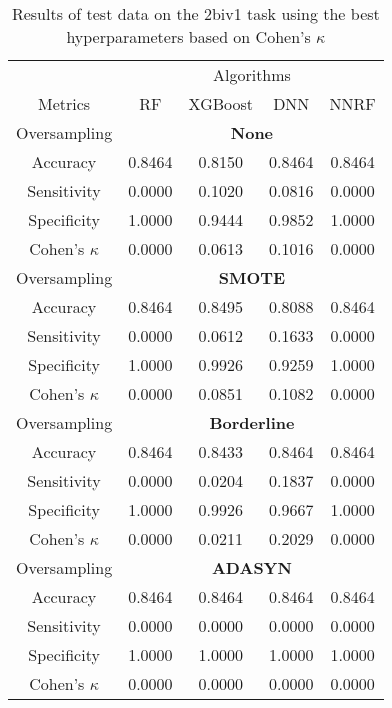 \begin{table}[!htb]
\centering
\caption{Results of test data on the 2biv1 task using the best hyperparameters based on Cohen's $\kappa$}
\label{tab:2biv1_test_results}
\begin{tabular}{c | c c c c}
\hline
 & \multicolumn{4}{c}{Algorithms}\\ 
Metrics &RF & XGBoost & DNN & NNRF\\ 
\hline
Oversampling &\multicolumn{4}{|c}{\textbf{None}}\\ 
\hline
Accuracy & 0.8464 & 0.8150 & 0.8464 & 0.8464\\ 
Sensitivity & 0.0000 & 0.1020 & 0.0816 & 0.0000\\ 
Specificity & 1.0000 & 0.9444 & 0.9852 & 1.0000\\ 
Cohen's $\kappa$ & 0.0000 & 0.0613 & 0.1016 & 0.0000\\ 
\hline
Oversampling &\multicolumn{4}{|c}{\textbf{SMOTE}}\\ 
\hline
Accuracy & 0.8464 & 0.8495 & 0.8088 & 0.8464\\ 
Sensitivity & 0.0000 & 0.0612 & 0.1633 & 0.0000\\ 
Specificity & 1.0000 & 0.9926 & 0.9259 & 1.0000\\ 
Cohen's $\kappa$ & 0.0000 & 0.0851 & 0.1082 & 0.0000\\ 
\hline
Oversampling &\multicolumn{4}{|c}{\textbf{Borderline}}\\ 
\hline
Accuracy & 0.8464 & 0.8433 & 0.8464 & 0.8464\\ 
Sensitivity & 0.0000 & 0.0204 & 0.1837 & 0.0000\\ 
Specificity & 1.0000 & 0.9926 & 0.9667 & 1.0000\\ 
Cohen's $\kappa$ & 0.0000 & 0.0211 & 0.2029 & 0.0000\\ 
\hline
Oversampling &\multicolumn{4}{|c}{\textbf{ADASYN}}\\ 
\hline
Accuracy & 0.8464 & 0.8464 & 0.8464 & 0.8464\\ 
Sensitivity & 0.0000 & 0.0000 & 0.0000 & 0.0000\\ 
Specificity & 1.0000 & 1.0000 & 1.0000 & 1.0000\\ 
Cohen's $\kappa$ & 0.0000 & 0.0000 & 0.0000 & 0.0000\\ 
\hline
\end{tabular}
\end{table}

